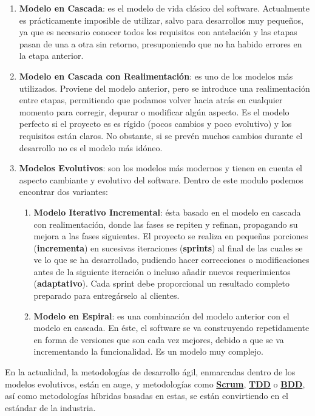 \begin{enumerate}
    \item {\bfseries Modelo en Cascada}: es el modelo de vida clásico del software. Actualmente es prácticamente imposible de utilizar, salvo para desarrollos muy pequeños, ya que es necesario conocer todos los requisitos con antelación y las etapas pasan de una a otra sin retorno, presuponiendo que no ha habido errores en la etapa anterior.
    \item {\bfseries Modelo en Cascada con Realimentación}: es uno de los modelos más utilizados. Proviene del modelo anterior, pero se introduce una realimentación entre etapas, permitiendo que podamos volver hacia atrás en cualquier momento para corregir, depurar o modificar algún aspecto. Es el modelo perfecto si el proyecto es es rígido (pocos cambios y poco evolutivo) y los requisitos están claros. No obstante, si se prevén muchos cambios durante el desarrollo no es el modelo más idóneo.
    \item {\bfseries Modelos Evolutivos}: son los modelos más modernos y tienen en cuenta el aspecto cambiante y evolutivo del software. Dentro de este modulo podemos encontrar dos variantes:
    \begin{enumerate}[label*=\arabic*.]
        \item {\bfseries Modelo Iterativo Incremental}: ésta basado en el modelo en cascada con realimentación, donde las fases se repiten y refinan, propagando su mejora a las fases siguientes. El proyecto se realiza en pequeñas porciones ({\bfseries incrementa}) en sucesivas iteraciones ({\bfseries sprints}) al final de las cuales se ve lo que se ha desarrollado, pudiendo hacer correcciones o modificaciones antes de la siguiente iteración o incluso añadir nuevos requerimientos ({\bfseries adaptativo}). Cada sprint debe proporcional un resultado completo preparado para entregárselo al clientes.
        \item {\bfseries Modelo en Espiral}: es una combinación del modelo anterior con el modelo en cascada. En éste, el software se va construyendo repetidamente en forma de versiones que son cada vez mejores, debido a que se va incrementando la funcionalidad. Es un modelo muy complejo.
    \end{enumerate}
\end{enumerate}

En la actualidad, la {metodologías de desarrollo ágil}, enmarcadas dentro de los modelos evolutivos, están en auge, y metodologías como {\bfseries \href{https://es.wikipedia.org/wiki/Scrum_(desarrollo_de_software)}{Scrum}}, {\bfseries \href{https://es.wikipedia.org/wiki/Desarrollo_guiado_por_pruebas}{TDD}} o {\bfseries \href{https://es.wikipedia.org/wiki/Desarrollo_guiado_por_comportamiento}{BDD}}, así como metodologías híbridas basadas en estas, se están convirtiendo en el estándar de la industria. \cite{batool01}

